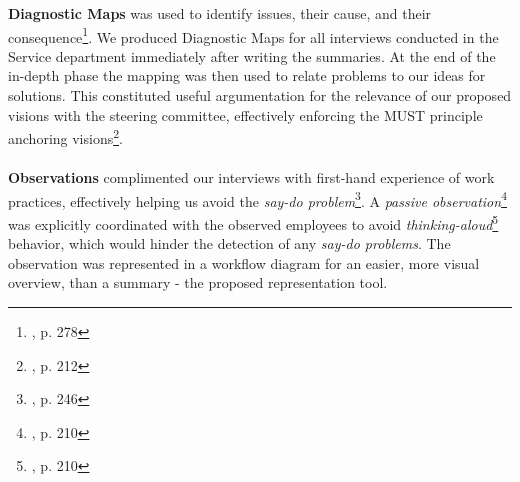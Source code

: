 \textbf{Diagnostic Maps}
was used to identify issues, their cause, and their consequence\footnote{\cite{boedker}, p. 278}. We produced Diagnostic Maps for all interviews conducted in the Service department immediately after writing the summaries. At the end of the in-depth phase the mapping was then used to relate problems to our ideas for solutions. This constituted useful argumentation for the relevance of our proposed visions with the steering committee, effectively enforcing the  MUST principle anchoring visions\footnote{\cite{boedker}, p. 212}.
\\\\
\textbf{Observations}  complimented our interviews with first-hand experience of work practices, effectively helping us avoid the \textit{say-do problem}\footnote{\cite{boedker}, p. 246}. A \textit{passive observation}\footnote{\cite{boedker}, p. 210} was explicitly coordinated with the observed employees to avoid \textit{thinking-aloud}\footnote{\cite{boedker}, p. 210} behavior, which would hinder the detection of any \textit{say-do problems}. The observation was represented in a workflow diagram for an easier, more visual overview, than a summary - the proposed representation tool.